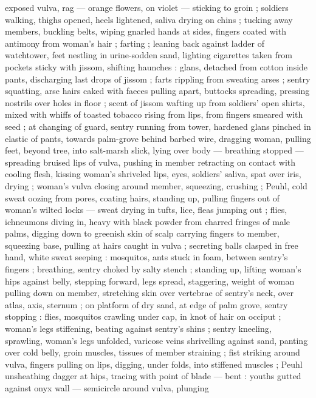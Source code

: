 exposed vulva, rag --- orange flowers, on violet --- sticking to groin ; soldiers walking, thighs
opened, heels lightened, saliva drying on chins ; tucking away members, buckling belts, wiping
gnarled hands at sides, fingers coated with antimony from woman's hair ; farting ; leaning back
against ladder of watchtower, feet nestling in urine-sodden sand, lighting cigarettes %
taken from pockets sticky with jissom, shifting haunches : glans, detached from cotton inside pants,
discharging last drops of jissom ; farts rippling from sweating arses ; sentry squatting, arse hairs
caked with faeces pulling apart, buttocks spreading, pressing nostrils over holes in floor ; scent
of jissom wafting up from soldiers' open shirts, mixed with whiffs of toasted tobacco rising from
lips, from fingers smeared with seed ; at changing of guard, sentry running from tower, hardened
glans pinched in elastic of pants, towards palm-grove behind barbed wire, dragging woman, pulling
feet, beyond tree, into salt-marsh slick, lying over body --- breathing stopped --- spreading
bruised lips of vulva, pushing in member retracting on contact with cooling flesh, kissing woman's
shriveled lips, eyes, soldiers' saliva, spat over iris, drying ; woman's vulva closing around
member, squeezing, crushing ; Peuhl, cold sweat oozing from pores, coating hairs, standing up,
pulling fingers out of woman's wilted locks --- sweat drying in tufts, lice, fleas jumping out ;
flies, ichneumons diving in, heavy with black powder from charred fringes of male palms, digging
down to greenish skin of scalp {\dashcom} carrying fingers to member, squeezing base, pulling at
hairs caught in vulva ; secreting balls clasped in free hand, white sweat seeping : mosquitos, ants
stuck in foam, between sentry's fingers ; breathing, sentry choked by salty stench ; standing up,
lifting woman's hips against belly, stepping forward, legs spread, staggering, weight of woman
pulling down on member, stretching skin over vertebrae of sentry's neck, over atlas, axis, sternum ;
on platform of dry sand, at edge of palm grove, sentry stopping : flies, mosquitos crawling under
cap, in knot of hair on occiput ; woman's legs stiffening, beating against sentry's shins ; sentry
kneeling, sprawling, woman's legs unfolded, varicose veins shrivelling against sand, panting over
cold belly, groin muscles, tissues of member straining ; fist striking around vulva, fingers pulling
on lips, digging, under folds, into stiffened muscles ; Peuhl unsheathing dagger at hips, tracing
with point of blade --- bent : youths gutted against onyx wall --- semicircle around vulva, plunging
